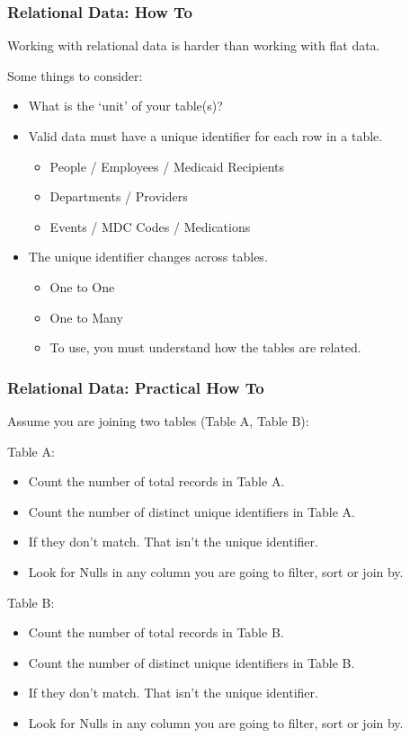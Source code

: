\documentclass{beamer}
\begin{document}
\begin{frame}
  \frametitle{Relational Data: How To}
  
  Working with relational data is harder than working with flat data.

  \bigskip
  Some things to consider:

  \begin{itemize}
  \item What is the `unit' of your table(s)?
  \item Valid data must have a unique identifier for each row in a table.
    \begin{itemize}
    \item People / Employees / Medicaid Recipients
    \item Departments / Providers
    \item Events / MDC Codes / Medications
    \end{itemize}
  \item The unique identifier changes across tables.
    \begin{itemize}
    \item One to One
    \item One to Many
    \item To use, you must understand how the tables are related.
    \end{itemize}
  \end{itemize}

\end{frame}

\begin{frame}
  \frametitle{Relational Data: Practical How To}
  
  Assume you are joining two tables (Table A, Table B):

  \smallskip
  Table A:
  \begin{itemize}
  \item Count the number of total records in Table A.
  \item Count the number of distinct unique identifiers in Table A.
  \item If they don't match. That isn't the unique identifier.
  \item Look for Nulls in any column you are going to filter, sort or
    join by.
  \end{itemize}

  \smallskip
  Table B:
  \begin{itemize}  
  \item Count the number of total records in Table B.
  \item Count the number of distinct unique identifiers in Table B.
  \item If they don't match. That isn't the unique identifier.
  \item Look for Nulls in any column you are going to filter, sort or
    join by.
  \end{itemize}

\end{frame}
\end{document}
